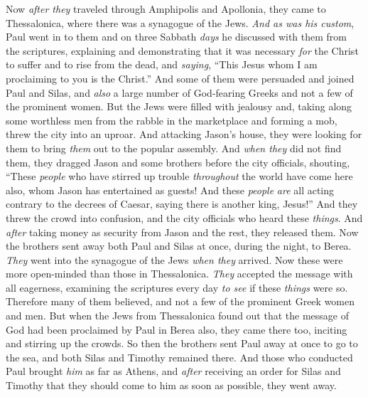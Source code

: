 \begin{biblechapter} %
 Now \textit{after they} traveled through Amphipolis and Apollonia, they came to Thessalonica, where there was a synagogue of the Jews.
\verse \textit{And as was his custom}, Paul went in to them and on three Sabbath \textit{days} he discussed with them from the scriptures,
\verse explaining and demonstrating that it was necessary \textit{for} the Christ to suffer and to rise from the dead, and \textit{saying}, “This Jesus whom I am proclaiming to you is the Christ.”
\verse And some of them were persuaded and joined Paul and Silas, and \textit{also} a large number of God-fearing Greeks and not a few of the prominent women.
\verse But the Jews were filled with jealousy and, taking along some worthless men from the rabble in the marketplace and forming a mob, threw the city into an uproar. And attacking Jason’s house, they were looking for them to bring \textit{them} out to the popular assembly.
\verse And \textit{when they} did not find them, they dragged Jason and some brothers before the city officials, shouting, “These \textit{people} who have stirred up trouble \textit{throughout} the world have come here also,
\verse whom Jason has entertained as guests! And these \textit{people} \textit{are} all acting contrary to the decrees of Caesar, saying there is another king, Jesus!”
\verse And they threw the crowd into confusion, and the city officials who heard these \textit{things}.
\verse And \textit{after} taking money as security from Jason and the rest, they released them.
 Now the brothers sent away both Paul and Silas at once, during the night, to Berea. \textit{They} went into the synagogue of the Jews \textit{when they} arrived.
\verse Now these were more open-minded than those in Thessalonica. \textit{They} accepted the message with all eagerness, examining the scriptures every day \textit{to see} if these \textit{things} were so.
\verse Therefore many of them believed, and not a few of the prominent Greek women and men.
\verse But when the Jews from Thessalonica found out that the message of God had been proclaimed by Paul in Berea also, they came there too, inciting and stirring up the crowds.
\verse So then the brothers sent Paul away at once to go to the sea, and both Silas and Timothy remained there.
\verse And those who conducted Paul brought \textit{him} as far as Athens, and \textit{after} receiving an order for Silas and Timothy that they should come to him as soon as possible, they went away.

\end{biblechapter}
